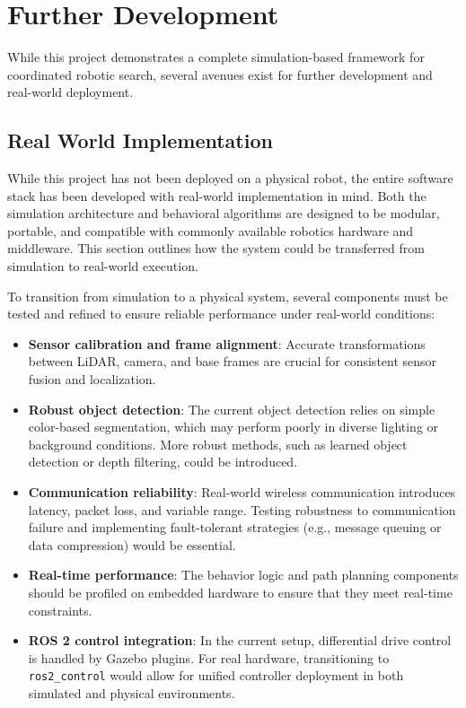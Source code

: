\section{Further Development}

While this project demonstrates a complete simulation-based framework for coordinated robotic search, several avenues exist for further development and real-world deployment.

\subsection{Real World Implementation}
While this project has not been deployed on a physical robot, the entire software stack has been developed with real-world implementation in mind. 
Both the simulation architecture and behavioral algorithms are designed to be modular, portable, and compatible with commonly available robotics hardware and middleware. 
This section outlines how the system could be transferred from simulation to real-world execution.

To transition from simulation to a physical system, several components must be tested and refined to ensure reliable performance under real-world conditions:
\begin{itemize}
  \item \textbf{Sensor calibration and frame alignment}: Accurate transformations between LiDAR, camera, and base frames are crucial for consistent sensor fusion and localization.
  \item \textbf{Robust object detection}: The current object detection relies on simple color-based segmentation, which may perform poorly in diverse lighting or background conditions. More robust methods, such as learned object detection or depth filtering, could be introduced.
  \item \textbf{Communication reliability}: Real-world wireless communication introduces latency, packet loss, and variable range. Testing robustness to communication failure and implementing fault-tolerant strategies (e.g., message queuing or data compression) would be essential.
  \item \textbf{Real-time performance}: The behavior logic and path planning components should be profiled on embedded hardware to ensure that they meet real-time constraints.
  \item \textbf{ROS 2 control integration}: In the current setup, differential drive control is handled by Gazebo plugins. For real hardware, transitioning to \texttt{ros2\_control} would allow for unified controller deployment in both simulated and physical environments.
\end{itemize}

